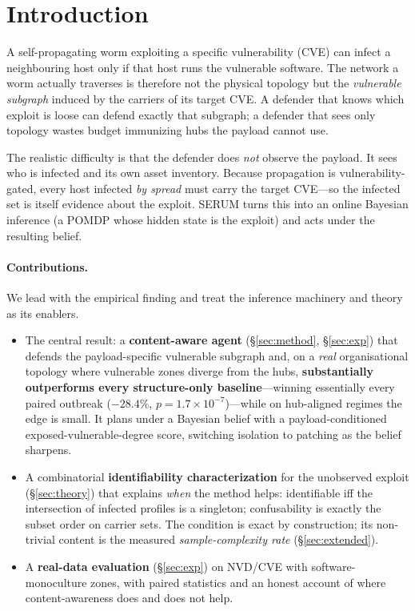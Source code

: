 \documentclass[11pt]{article}
\begin{document}
\section{Introduction}
A self-propagating worm exploiting a specific vulnerability (CVE) can infect a
neighbouring host only if that host runs the vulnerable software. The network a
worm actually traverses is therefore not the physical topology but the
\emph{vulnerable subgraph} induced by the carriers of its target CVE. A defender
that knows which exploit is loose can defend exactly that subgraph; a defender
that sees only topology wastes budget immunizing hubs the payload cannot use.

The realistic difficulty is that the defender does \emph{not} observe the
payload. It sees who is infected and its own asset inventory. Because
propagation is vulnerability-gated, every host infected \emph{by spread} must
carry the target CVE---so the infected set is itself evidence about the exploit.
SERUM turns this into an online Bayesian inference (a POMDP whose hidden state is
the exploit) and acts under the resulting belief.

\paragraph{Contributions.} We lead with the empirical finding and treat the
inference machinery and theory as its enablers.
\begin{itemize}
\item The central result: a \textbf{content-aware agent} (\S\ref{sec:method},
\S\ref{sec:exp}) that defends the payload-specific vulnerable subgraph and, on a
\emph{real} organisational topology where vulnerable zones diverge from the hubs,
\textbf{substantially outperforms every structure-only baseline}---winning
essentially every paired outbreak ($-28.4\%$, $p=1.7\times10^{-7}$)---while on
hub-aligned regimes the edge is small. It plans under a Bayesian belief with a
payload-conditioned exposed-vulnerable-degree score, switching isolation to
patching as the belief sharpens.
\item A combinatorial \textbf{identifiability characterization} for the
unobserved exploit (\S\ref{sec:theory}) that explains \emph{when} the method helps:
identifiable iff the intersection of infected profiles is a singleton; confusability
is exactly the subset order on carrier sets. The condition is exact by construction;
its non-trivial content is the measured \emph{sample-complexity rate}
(\S\ref{sec:extended}).
\item A \textbf{real-data evaluation} (\S\ref{sec:exp}) on NVD/CVE with
software-monoculture zones, with paired statistics and an honest account of where
content-awareness does and does not help.
\end{itemize}
\end{document}

